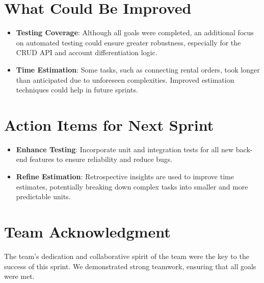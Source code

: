 \documentclass[a4paper,12pt]{article}
\begin{document}
\section*{What Could Be Improved}
\begin{itemize}
    \item \textbf{Testing Coverage}: Although all goals were completed, an additional focus on automated testing could ensure greater robustness, especially for the CRUD API and account differentiation logic.
    \item \textbf{Time Estimation}: Some tasks, such as connecting rental orders, took longer than anticipated due to unforeseen complexities. Improved estimation techniques could help in future sprints.
\end{itemize}

\section*{Action Items for Next Sprint}
\begin{itemize}

    \item \textbf{Enhance Testing}: Incorporate unit and integration tests for all new back-end features to ensure reliability and reduce bugs.
    \item \textbf{Refine Estimation}: Retrospective insights are used to improve time estimates, potentially breaking down complex tasks into smaller and more predictable units.
\end{itemize}

\section*{Team Acknowledgment}
The team’s dedication and collaborative spirit of the team were the key to the success of this sprint. We demonstrated strong teamwork, ensuring that all goals were met. 
\end{document}
